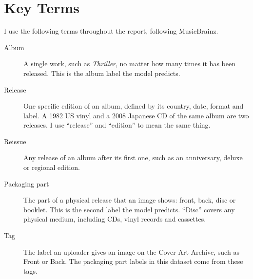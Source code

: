 \documentclass[11pt,a4paper]{article}
\begin{document}
\clearpage\appendix
\section{Key Terms}\label{app:terms}
I use the following terms throughout the report, following MusicBrainz.
\begin{description}
\item[Album] A single work, such as \textit{Thriller}, no matter how many times it has been released. This is the album label the model predicts.
\item[Release] One specific edition of an album, defined by its country, date, format and label. A 1982 US vinyl and a 2008 Japanese CD of the same album are two releases. I use ``release'' and ``edition'' to mean the same thing.
\item[Reissue] Any release of an album after its first one, such as an anniversary, deluxe or regional edition.
\item[Packaging part] The part of a physical release that an image shows: front, back, disc or booklet. This is the second label the model predicts. ``Disc'' covers any physical medium, including CDs, vinyl records and cassettes.
\item[Tag] The label an uploader gives an image on the Cover Art Archive, such as Front or Back. The packaging part labels in this dataset come from these tags.
\end{description}
\end{document}
